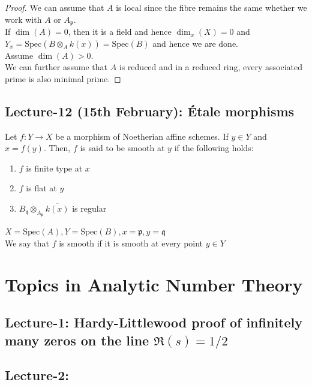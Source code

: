 \documentclass[oneside, 12pt]{scrbook}
\newcommand{\spec}{\mathrm{Spec}}
\newcommand{\pr}{\mathfrak{p}}
\theoremstyle{theorem}
\begin{document}
\begin{proof}
We can assume that $A$ is local since the fibre remains the same whether we work with $A$ or $A_{\pr}$. \\

If $\dim (A)=0$, then it is a field and hence $\dim_{x}(X)=0$ and $Y_{x} = \spec(B \otimes_{A} k(x)) = \spec(B)$ and hence we are done. \\

Assume $\dim (A) > 0$. \\

We can further assume that $A$ is reduced and in a reduced ring, every associated prime is also minimal prime. 
\end{proof}


\chapter{Lecture-12 (15th February): \'{E}tale morphisms}

\begin{definition}
Let $f: Y \rightarrow X$ be a morphism of Noetherian affine schemes. If $y \in Y$ and $x=f(y)$. Then, $f$ is said to be smooth at $y$ if the following holds: 
\begin{enumerate}
\item $f$ is finite type at $x$
\item $f$ is flat at $y$
\item $B_{\mathfrak{q}} \otimes_{A_{\pr}} \overline{k(x)}$ is regular
\end{enumerate}
$X = \spec(A), Y = \spec(B), x= \pr , y = \mathfrak{q}$\\

We say that $f$ is smooth if it is smooth at every point $y \in Y$
\end{definition}

\part{Topics in Analytic Number Theory}

\chapter{Lecture-1: Hardy-Littlewood proof of infinitely many zeros on the line $\mathfrak{R}(s) = 1/2$}

\chapter{Lecture-2: }
\end{document}
